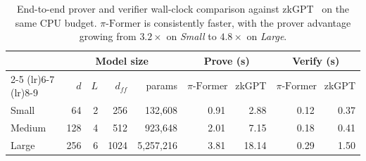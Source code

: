 \documentclass[letterpaper,twocolumn,10pt]{article}
\theoremstyle{remark}
\theoremstyle{definition}
\newcommand{\sys}{\ensuremath{\pi\text{-Former}}}
\newcommand{\bphi}{\boldsymbol{\phi}}
\begin{document}
\begin{table}[t]
\centering
\scriptsize
\setlength{\tabcolsep}{4pt}
\begin{tabular}{@{}lrrrrrrrr@{}}
\toprule
       & \multicolumn{4}{c}{Model size}
       & \multicolumn{2}{c}{Prove (s)}
       & \multicolumn{2}{c}{Verify (s)} \\
\cmidrule(lr){2-5} \cmidrule(lr){6-7} \cmidrule(lr){8-9}
       & $d$ & $L$ & $d_{ff}$ & params       & \sys{} & zkGPT  & \sys{} & zkGPT \\
\midrule
Small  & 64  & 2   & 256      & 132{,}608    & 0.91   & 2.88   & 0.12   & 0.37  \\
Medium & 128 & 4   & 512      & 923{,}648    & 2.01   & 7.15   & 0.18   & 0.41  \\
Large  & 256 & 6   & 1024     & 5{,}257{,}216 & 3.81   & 18.14  & 0.29   & 1.50  \\
\bottomrule
\end{tabular}
\caption{End-to-end prover and verifier wall-clock comparison against
zkGPT~\cite{qu2025zkgpt} on the same CPU budget. \sys{} is
consistently faster, with the prover advantage growing from
$3.2\times$ on \emph{Small} to $4.8\times$ on \emph{Large}.}
\label{tab:eval-vs-zkgpt}
\end{table}


\end{document}
